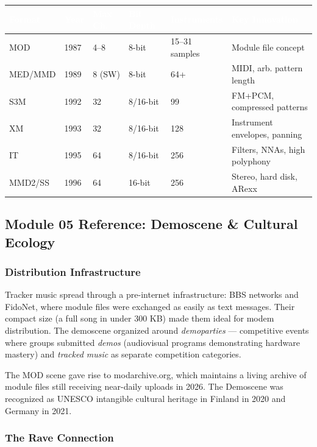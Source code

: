 \documentclass[11pt,letterpaper]{article}
\newcommand{\tableheader}[1]{\textbf{\sffamily\textcolor{white}{#1}}}
\begin{document}
\begin{center}
\begin{tabularx}{\textwidth}{L{2cm}C{1.5cm}C{1.5cm}C{2cm}C{2cm}L{3cm}}
\toprule
{}
\tableheader{Format} & \tableheader{Year} & \tableheader{Max Ch.} & \tableheader{Bit Depth} & \tableheader{Instruments} & \tableheader{Key Innovation} \\
\midrule
MOD & 1987 & 4--8 & 8-bit & 15--31 samples & Module file concept \\
MED/MMD & 1989 & 8 (SW) & 8-bit & 64+ & MIDI, arb. pattern length \\
S3M & 1992 & 32 & 8/16-bit & 99 & FM+PCM, compressed patterns \\
XM & 1993 & 32 & 8/16-bit & 128 & Instrument envelopes, panning \\
IT & 1995 & 64 & 8/16-bit & 256 & Filters, NNAs, high polyphony \\
MMD2/SS & 1996 & 64 & 16-bit & 256 & Stereo, hard disk, ARexx \\
\bottomrule
\end{tabularx}
\end{center}

\subsection{Module 05 Reference: Demoscene \& Cultural Ecology}

\subsubsection{Distribution Infrastructure}

Tracker music spread through a pre-internet infrastructure: BBS networks and FidoNet, where module files were exchanged as easily as text messages. Their compact size (a full song in under 300 KB) made them ideal for modem distribution. The demoscene organized around \textit{demoparties} --- competitive events where groups submitted \textit{demos} (audiovisual programs demonstrating hardware mastery) and \textit{tracked music} as separate competition categories.

The MOD scene gave rise to modarchive.org, which maintains a living archive of module files still receiving near-daily uploads in 2026. The Demoscene was recognized as UNESCO intangible cultural heritage in Finland in 2020 and Germany in 2021.

\subsubsection{The Rave Connection}
\end{document}
